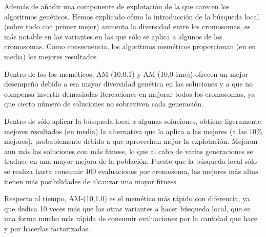 \documentclass{article}
\begin{document}
Además de añadir una componente de explotación de la que carecen los algoritmos genéticos. Hemos explicado cómo la introducción de
la búsqueda local (sobre todo con primer mejor) aumenta la diversidad entre los cromosomas, es más notable en las variantes en las que sólo
se aplica a algunos de los cromosomas. Como consecuencia, los algoritmos meméticos proporcionan (en en media) los mejores resultados

Dentro de los los meméticos, AM-(10,0.1) y AM-(10,0.1mej) ofrecen un mejor desempeño debido a esa mayor diversidad genética en las soluciones y a que
no compensa invertir demasiadas itereaciones en mejorar todos los cromosomas, ya que cierto número de soluciones no sobreviven cada
generación. 

Dentro de sólo aplicar la búsqueda local a algunas soluciones, obtiene ligeramente mejores resultados (en media) la alternativa que la aplica
a las mejores (a las 10\% mejores), probablemente debido a que aprovechan mejor la explotación. Mejoran aun más las soluciones con más
fitness, lo que al cabo de varias generaciones se traduce en una mayor mejora de la población. Puesto que la búsqueda local sólo
se realiza hasta consumir 400 evaluaciones por cromosoma, las mejores más altas tienen más posibilidades de alcanzar una mayor fitness.

Respecto al tiempo, AM-(10,1.0) es el memético más rápido con diferencia, ya que dedica 10 veces más que las otras variantes a hacer
búsqueda local, que es una forma mucho más rápida de consumir evaluaciones por la cantidad que hace y por hacerlas factorizadas.
\end{document}
